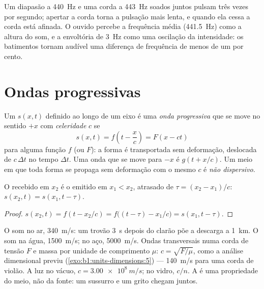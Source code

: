 \begin{example}\label{ex:b1:wave-propagation:tuning}
Um diapasão a \qty{440}{Hz} e uma corda a \qty{443}{Hz} soados
juntos pulsam três vezes por segundo; apertar a corda torna a pulsação mais
lenta, e quando ela cessa a corda está afinada. O ouvido percebe a frequência
média (\qty{441.5}{Hz}) como a altura do som, e a envoltória de \qty{3}{Hz} como
uma oscilação da intensidade: os batimentos tornam audível uma diferença de frequência de menos de um
por cento.
\end{example}

\section{Ondas progressivas}

\begin{definition}\label{def:b1:wave-propagation:travelling}
Um  $s(x, t)$ definido ao longo de um eixo é uma \emph{onda progressiva}
que se move no sentido $+x$ com \emph{celeridade} $c$ se
\[
s(x, t) = f\!\left(t - \frac{x}{c}\right) = F(x - ct)
\]
para alguma função $f$ (ou $F$): a forma é transportada sem deformação,
deslocada de $c\,\Delta t$ no tempo $\Delta t$. Uma onda que se move para $-x$ é
$g(t + x/c)$. Um meio em que toda forma se propaga sem deformação com
o mesmo $c$ é \emph{não dispersivo}.
\end{definition}

\begin{proposition}[Atraso]\label{prop:b1:wave-propagation:delay}
O  recebido em $x_2$ é o  emitido em $x_1 < x_2$,
atrasado de $\tau = (x_2 - x_1)/c$: $s(x_2, t) = s(x_1, t - \tau)$.
\end{proposition}

\begin{proof}
$s(x_2, t) = f(t - x_2/c) = f\big((t - \tau) - x_1/c\big) = s(x_1, t - \tau)$.
\end{proof}

\begin{example}[Celeridades]\label{ex:b1:wave-propagation:celerities}
O som no ar, \qty{340}{m/s}: um trovão \qty{3}{s} depois do clarão põe
a descarga a \qty{1}{km}. O som na água, \qty{1500}{m/s}; no aço,
\qty{5000}{m/s}. Ondas transversais numa corda de tensão $F$ e massa
por unidade de comprimento $\mu$: $c = \sqrt{F/\mu}$, como a análise dimensional
previu (\cref{exo:b1:units-dimensions:5}) --- \qty{140}{m/s} para uma
corda de violão. A luz no vácuo, $c = \qty{3.00e8}{m/s}$; no vidro,
$c/n$. A  é uma propriedade do meio, não da fonte: um
sussurro e um grito chegam juntos.
\end{example}


